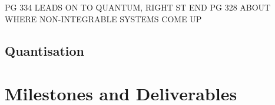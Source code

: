 \documentclass[12pt,a4paper]{amsart}
\begin{document}
 
 PG 334 LEADS ON TO QUANTUM, RIGHT ST END
 PG 328 ABOUT WHERE NON-INTEGRABLE SYSTEMS COME UP


\subsection{Quantisation}

\section{Milestones and Deliverables}
\end{document}
